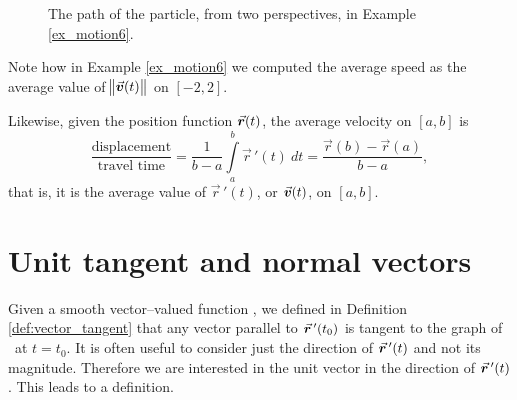 \begin{example}
\begin{enumerate}
\end{enumerate}
\begin{figure}[H]
\centering
\centerline{
\hspace{1cm}
}
\caption{The path of the particle, from two perspectives, in Example \ref{ex_motion6}.}
\end{figure}
\vspace*{-0.5cm}
\end{example}

Note how in Example \ref{ex_motion6} we computed the average speed as the average value of $\norm{\vvt}$ on $[-2,2]$.

Likewise, given the position function $\vrt$, the average velocity on $[a,b]$ is
$$\frac{\text{displacement}}{\text{travel time}} = \frac1{b-a}\int\limits_a^b \vec{r}\,'(t)\ dt = \frac{\vec r(b)-\vec r(a)}{b-a},$$
that is, it is the average value of $\vec r\,'(t)$, or $\vvt$, on $[a,b]$.\\

\section{Unit tangent and normal vectors}\label{sec:tan_norm}

Given a smooth vector--valued function \vrt, we defined in Definition \ref{def:vector_tangent} that any vector parallel to $\vrp(t_0)$ is tangent to the graph of \vrt\ at $t=t_0$. It is often useful to consider just the direction of $\vrp(t)$ and not its magnitude. Therefore we are interested in the unit vector in the direction of $\vrp(t)$. This leads to a definition.

